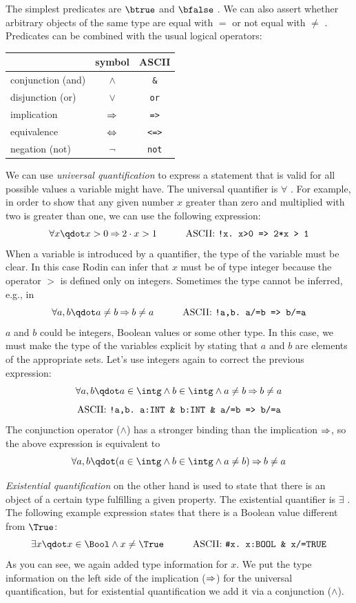 The simplest predicates are $\btrue$  and $\bfalse$ .
We can also assert whether arbitrary objects of the same type are equal with $=$ or not equal with $\neq$
\inascii{/=}.
Predicates can be combined with the usual logical operators:
\begin{center}
  \begin{tabular}{lcc}
                      & symbol   & ASCII \\
    \hline
    conjunction (and) & $\land$  & \texttt{\&} \\
    disjunction (or)   & $\lor$   & \texttt{or} \\
    implication       & $\mathbin\Rightarrow$  & \texttt{=>} \\
    equivalence       & $\mathbin\Leftrightarrow$  & \texttt{<=>} \\
    negation (not)    & $\lnot$  & \texttt{not} \\
  \end{tabular}
\end{center}
We can use \emph{universal quantification} to express a statement that is valid for all possible values
a variable might have. The universal quantifier is $\forall$ \inascii{!}. For example, in order to show that any given number $x$ greater than zero and multiplied with two is greater than one, we can use the following expression: 
\[ \forall x \qdot x>0 \limp 2\cdot x > 1 \lascii{!x.\ x>0\ =>\ 2*x\ >\ 1}\]
When a variable is introduced by a quantifier, the type of the variable must be clear. In this case Rodin can infer that $x$ must be of type integer because the operator $>$ is defined only on integers. Sometimes the type cannot be inferred, e.g., in
\[ \forall a,b \qdot a\neq b \limp b\neq a \lascii{!a,b.\ a/=b\ =>\ b/=a} \]
$a$ and $b$ could be integers, Boolean values or some other type.
In this case, we must make the type of the variables explicit by stating that $a$ and $b$ are elements
of the appropriate sets. Let's use integers again to correct the previous expression:
\[ \forall a,b \qdot a\in\intg \land b\in\intg \land a\neq b \limp b\neq a\]
\[ \textrm{ASCII: } \texttt{!a,b.\ a:INT \& b:INT \& a/=b => b/=a} \]
The conjunction operator ($\land$) has a stronger binding than the implication $\mathbin\Rightarrow$, so the above expression is equivalent to
\[ \forall a,b \qdot (a\in\intg \land b\in\intg \land a\neq b) \limp b\neq a\]


\emph{Existential quantification} on the other hand is used to state that there is an object of a certain type fulfilling a given property. The existential quantifier is $\exists$ \inascii{\#}. The following example expression states that there is a Boolean value different from $\True$:
\[ \exists x \qdot x\in\Bool \land x\neq\True \lascii{\#x.\ x:BOOL\ \&\ x/=TRUE} \]
As you can see, we again added type information for $x$. We put the type information on the left side of the implication ($\mathbin\Rightarrow$) for the universal quantification, but for existential quantification we add it via a conjunction ($\land$).

